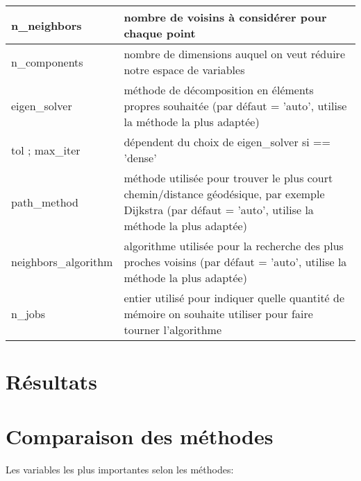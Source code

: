 \documentclass[12pt]{report}
\begin{document}
\begin{table}[!h]
\begin{tabular}{@{}|l|l|@{}}
\toprule
n\_neighbors         & nombre de voisins à considérer pour chaque point                                                                                                       \\ \midrule
n\_components        & nombre de dimensions auquel on veut réduire notre espace de variables                                                                                  \\ \midrule
eigen\_solver        & méthode de décomposition en éléments propres souhaitée (par défaut = 'auto',  utilise la méthode la plus adaptée)                                      \\ \midrule
tol ; max\_iter      & dépendent du choix de eigen\_solver si == 'dense'                                                                                                      \\ \midrule
path\_method         & méthode utilisée pour trouver le plus court chemin/distance géodésique, par exemple Dijkstra (par défaut = 'auto', utilise la méthode la plus adaptée) \\ \midrule
neighbors\_algorithm & algorithme utilisée pour la recherche des plus proches voisins (par défaut = 'auto', utilise la méthode la plus adaptée)                               \\ \midrule
n\_jobs              & entier utilisé pour indiquer quelle quantité de mémoire on souhaite utiliser pour faire tourner l'algorithme                                           \\ \bottomrule
\end{tabular}
\end{table}


\newpage
\part{Résultats}

\newpage
\part{Comparaison des méthodes}

Les variables les plus importantes selon les méthodes:
\end{document}
